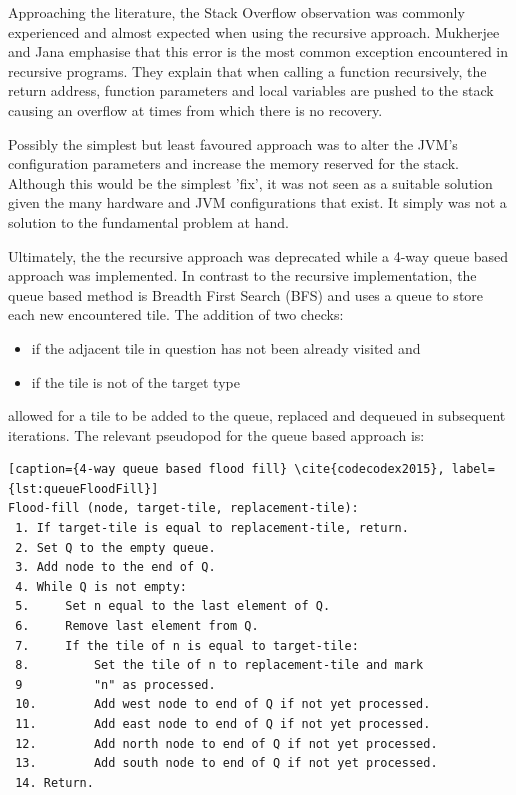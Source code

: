 Approaching the literature, the Stack Overflow observation was commonly experienced and almost expected when using the recursive approach.  Mukherjee and Jana \cite{mukherjeJana2010} emphasise that this error is the most common exception encountered in recursive programs. They explain that when calling a function recursively, the return address, function parameters and local variables are pushed to the stack causing an overflow at times from which there is no recovery.
 
Possibly the simplest but least favoured approach was to alter the JVM's configuration parameters and increase the memory reserved for the stack.  Although this would be the simplest 'fix', it was not seen as a suitable solution given the many hardware and JVM configurations that exist. It simply was not a solution to the fundamental problem at hand.

Ultimately, the the recursive approach was deprecated while a 4-way queue based approach was implemented.  In contrast to the recursive implementation, the queue based method is Breadth First Search (BFS) and uses a queue to store each new encountered tile.  The addition of two checks:

\begin{itemize}
  \item if the adjacent tile in question has not been already visited and
  \item if the tile is not of the target type
\end{itemize}

allowed for a tile to be added to the queue, replaced and dequeued in subsequent iterations. The relevant pseudopod for the queue based approach is:

\begin{minipage}{0.9\textwidth}
	\begin{lstlisting}[caption={4-way queue based flood fill} \cite{codecodex2015}, label={lst:queueFloodFill}]
Flood-fill (node, target-tile, replacement-tile):
 1. If target-tile is equal to replacement-tile, return.
 2. Set Q to the empty queue.
 3. Add node to the end of Q.
 4. While Q is not empty: 
 5.     Set n equal to the last element of Q.
 6.     Remove last element from Q.
 7.     If the tile of n is equal to target-tile:
 8.         Set the tile of n to replacement-tile and mark 
 9			"n" as processed.
 10.        Add west node to end of Q if not yet processed.
 11.        Add east node to end of Q if not yet processed.
 12.        Add north node to end of Q if not yet processed.
 13.        Add south node to end of Q if not yet processed.
 14. Return.
	\end{lstlisting}
\end{minipage}

